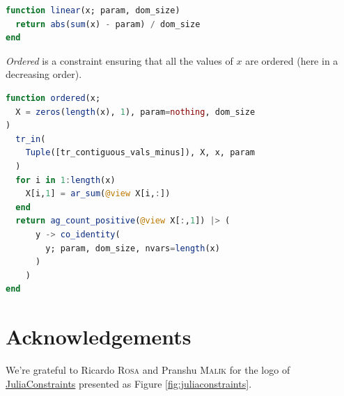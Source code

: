 \documentclass{juliacon}
\newcommand{\jc}{\href{https://github.com/JuliaConstraints}{JuliaConstraints}\xspace}
\begin{document}
\begin{lstlisting}[language = Julia]
function linear(x; param, dom_size)
  return abs(sum(x) - param) / dom_size
end
\end{lstlisting}

\emph{Ordered} is a constraint ensuring that all the values of $x$ are ordered (here in a decreasing order).

\begin{lstlisting}[language = Julia]
function ordered(x;
  X = zeros(length(x), 1), param=nothing, dom_size
)
  tr_in(
    Tuple([tr_contiguous_vals_minus]), X, x, param
  )
  for i in 1:length(x)
    X[i,1] = ar_sum(@view X[i,:])
  end
  return ag_count_positive(@view X[:,1]) |> (
      y -> co_identity(
        y; param, dom_size, nvars=length(x)
      )
    )
end
\end{lstlisting}

\section{Acknowledgements}
\label{sec:acknowledgements}

We're grateful to Ricardo \textsc{Rosa} and Pranshu \textsc{Malik} for the logo of \jc presented as Figure \ref{fig:juliaconstraints}.


\end{document}
